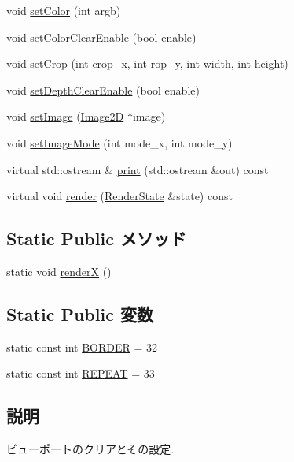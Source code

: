 \begin{CompactItemize}
void \hyperlink{classm3g_1_1Background_38439e862c59a31b90e57c18669061ae}{setColor} (int argb)
\item 
void \hyperlink{classm3g_1_1Background_68e4fe4cf32fe60f166056115081aa65}{setColorClearEnable} (bool enable)
\item 
void \hyperlink{classm3g_1_1Background_e543ac6196bbe65a7af8e6b8686441a7}{setCrop} (int crop\_\-x, int rop\_\-y, int width, int height)
\item 
void \hyperlink{classm3g_1_1Background_0953a713c22fd40cd586bcd8af80075a}{setDepthClearEnable} (bool enable)
\item 
void \hyperlink{classm3g_1_1Background_705b89b41cd1b38f664ed912be44baaa}{setImage} (\hyperlink{classm3g_1_1Image2D}{Image2D} $\ast$image)
\item 
void \hyperlink{classm3g_1_1Background_aba37cb460a2376f1a4722eebb4de9a9}{setImageMode} (int mode\_\-x, int mode\_\-y)
\item 
virtual std::ostream \& \hyperlink{classm3g_1_1Background_6fea17fa1532df3794f8cb39cb4f911f}{print} (std::ostream \&out) const 
\item 
virtual void \hyperlink{classm3g_1_1Background_8babc8a79b78615da51161e94029eea9}{render} (\hyperlink{structm3g_1_1RenderState}{RenderState} \&state) const 
\end{CompactItemize}
\subsection*{Static Public メソッド}
\begin{CompactItemize}
\item 
static void \hyperlink{classm3g_1_1Background_443a7a301f77f625335ecc06d13bad06}{renderX} ()
\end{CompactItemize}
\subsection*{Static Public 変数}
\begin{CompactItemize}
\item 
static const int \hyperlink{classm3g_1_1Background_ee380e01b33e589c24984e4c4c1c6501}{BORDER} = 32
\item 
static const int \hyperlink{classm3g_1_1Background_a466d02b3d88f856854d0a0955be32e8}{REPEAT} = 33
\end{CompactItemize}


\subsection{説明}
ビューポートのクリアとその設定. 


